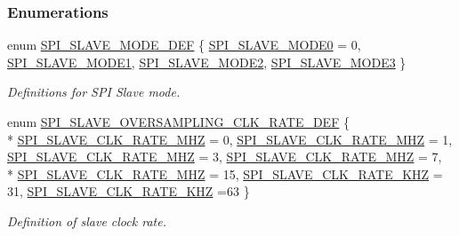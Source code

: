 \subsubsection*{Enumerations}
\begin{DoxyCompactItemize}
\item 
enum \hyperlink{group___s_p_i___s_l_a_v_e_ga8cb12470ae37e3883289b52731634acc}{S\+P\+I\+\_\+\+S\+L\+A\+V\+E\+\_\+\+M\+O\+D\+E\+\_\+\+D\+EF} \{ \hyperlink{group___s_p_i___s_l_a_v_e_gga8cb12470ae37e3883289b52731634acca823ffce26d59b56ced0dca0fd5e27417}{S\+P\+I\+\_\+\+S\+L\+A\+V\+E\+\_\+\+M\+O\+D\+E0} = 0, 
\hyperlink{group___s_p_i___s_l_a_v_e_gga8cb12470ae37e3883289b52731634accac40eb52d928367234ccb33b16f645495}{S\+P\+I\+\_\+\+S\+L\+A\+V\+E\+\_\+\+M\+O\+D\+E1}, 
\hyperlink{group___s_p_i___s_l_a_v_e_gga8cb12470ae37e3883289b52731634accaf544a818da9ac07473a5577dc88a73b2}{S\+P\+I\+\_\+\+S\+L\+A\+V\+E\+\_\+\+M\+O\+D\+E2}, 
\hyperlink{group___s_p_i___s_l_a_v_e_gga8cb12470ae37e3883289b52731634accaabfad961caf12e94b20b24d97c5ce2fd}{S\+P\+I\+\_\+\+S\+L\+A\+V\+E\+\_\+\+M\+O\+D\+E3}
 \}\begin{DoxyCompactList}\small\item\em Definitions for S\+PI Slave mode. \end{DoxyCompactList}
\item 
enum \hyperlink{group___s_p_i___s_l_a_v_e_ga829f1873bfb32bd5f6a679d3f4dd3979}{S\+P\+I\+\_\+\+S\+L\+A\+V\+E\+\_\+\+O\+V\+E\+R\+S\+A\+M\+P\+L\+I\+N\+G\+\_\+\+C\+L\+K\+\_\+\+R\+A\+T\+E\+\_\+\+D\+EF} \{ \\*
\hyperlink{group___s_p_i___s_l_a_v_e_gga829f1873bfb32bd5f6a679d3f4dd3979a41976f36b89d83f5a1fe9c9f90bb2bf2}{S\+P\+I\+\_\+\+S\+L\+A\+V\+E\+\_\+\+C\+L\+K\+\_\+\+R\+A\+T\+E\+\_\+M\+HZ} = 0, 
\hyperlink{group___s_p_i___s_l_a_v_e_gga829f1873bfb32bd5f6a679d3f4dd3979a6c83b8cd3c0f1c519e351ea43c092eb9}{S\+P\+I\+\_\+\+S\+L\+A\+V\+E\+\_\+\+C\+L\+K\+\_\+\+R\+A\+T\+E\+\_\+M\+HZ} = 1, 
\hyperlink{group___s_p_i___s_l_a_v_e_gga829f1873bfb32bd5f6a679d3f4dd3979a28c7d5ea8fd6ca0cd062d42ea4ab30aa}{S\+P\+I\+\_\+\+S\+L\+A\+V\+E\+\_\+\+C\+L\+K\+\_\+\+R\+A\+T\+E\+\_\+M\+HZ} = 3, 
\hyperlink{group___s_p_i___s_l_a_v_e_gga829f1873bfb32bd5f6a679d3f4dd3979a133c58cb7e8480bc0a67f470a8fe22c4}{S\+P\+I\+\_\+\+S\+L\+A\+V\+E\+\_\+\+C\+L\+K\+\_\+\+R\+A\+T\+E\+\_\+M\+HZ} = 7, 
\\*
\hyperlink{group___s_p_i___s_l_a_v_e_gga829f1873bfb32bd5f6a679d3f4dd3979a4fdaf2d65c083d4aeadc1e18e7230e3d}{S\+P\+I\+\_\+\+S\+L\+A\+V\+E\+\_\+\+C\+L\+K\+\_\+\+R\+A\+T\+E\+\_\+M\+HZ} = 15, 
\hyperlink{group___s_p_i___s_l_a_v_e_gga829f1873bfb32bd5f6a679d3f4dd3979a4809a0b19165f45ed56a45a634ec95eb}{S\+P\+I\+\_\+\+S\+L\+A\+V\+E\+\_\+\+C\+L\+K\+\_\+\+R\+A\+T\+E\+\_\+K\+HZ} = 31, 
\hyperlink{group___s_p_i___s_l_a_v_e_gga829f1873bfb32bd5f6a679d3f4dd3979afd7c69a2856dd2e6568484293e8a329f}{S\+P\+I\+\_\+\+S\+L\+A\+V\+E\+\_\+\+C\+L\+K\+\_\+\+R\+A\+T\+E\+\_\+K\+HZ} =63
 \}\begin{DoxyCompactList}\small\item\em Definition of slave clock rate. \end{DoxyCompactList}
\end{DoxyCompactItemize}
